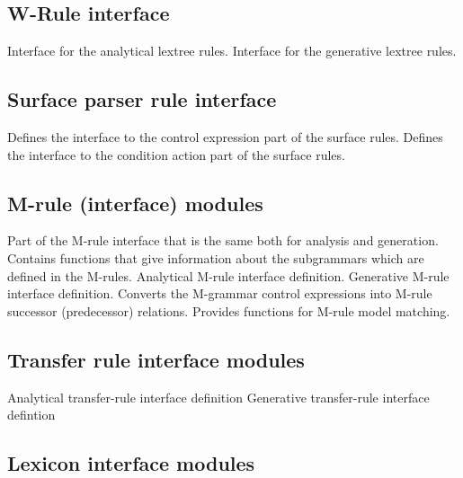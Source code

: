 \subsection{W-Rule interface}

\bsc
{} Interface for the analytical lextree rules.
 Interface for the generative lextree rules.
\esc

\subsection{Surface parser rule interface}

\bsc
{} Defines the interface to the control
                                 expression part of the surface rules.
 Defines the interface to the condition action part
                           of the surface rules.
\esc

\subsection{M-rule (interface) modules}

\bsc
{} Part of the M-rule interface that is the same both for
                     analysis and generation.
 Contains functions that give information about
                     the subgrammars which are defined in the M-rules.
 Analytical M-rule interface definition.
 Generative M-rule interface definition.
 Converts the M-grammar control expressions into
                        M-rule successor (predecessor) relations.
 Provides functions for M-rule model matching.
\esc

\subsection{Transfer rule interface modules}

\bsc
{} Analytical transfer-rule interface definition
 Generative transfer-rule interface defintion
\esc

\subsection{Lexicon interface modules}

